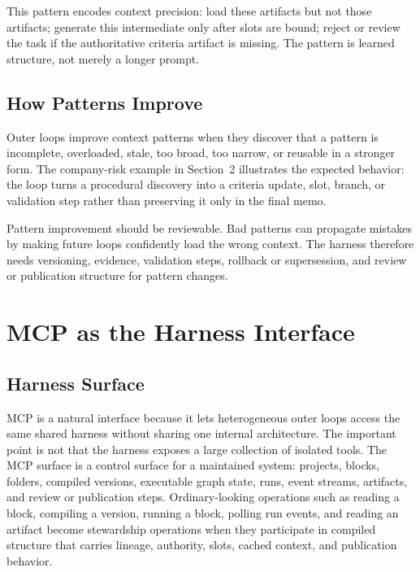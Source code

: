 \documentclass{article}
\begin{document}
This pattern encodes context precision: load these artifacts but not those artifacts; generate this intermediate only after slots are bound; reject or review the task if the authoritative criteria artifact is missing. The pattern is learned structure, not merely a longer prompt.

\subsection{How Patterns Improve}

Outer loops improve context patterns when they discover that a pattern is incomplete, overloaded, stale, too broad, too narrow, or reusable in a stronger form. The company-risk example in Section~2 illustrates the expected behavior: the loop turns a procedural discovery into a criteria update, slot, branch, or validation step rather than preserving it only in the final memo.

Pattern improvement should be reviewable. Bad patterns can propagate mistakes by making future loops confidently load the wrong context. The harness therefore needs versioning, evidence, validation steps, rollback or supersession, and review or publication structure for pattern changes.

\section{MCP as the Harness Interface}

\subsection{Harness Surface}

MCP is a natural interface because it lets heterogeneous outer loops access the same shared harness without sharing one internal architecture. The important point is not that the harness exposes a large collection of isolated tools. The MCP surface is a control surface for a maintained system: projects, blocks, folders, compiled versions, executable graph state, runs, event streams, artifacts, and review or publication steps. Ordinary-looking operations such as reading a block, compiling a version, running a block, polling run events, and reading an artifact become stewardship operations when they participate in compiled structure that carries lineage, authority, slots, cached context, and publication behavior.
\end{document}
